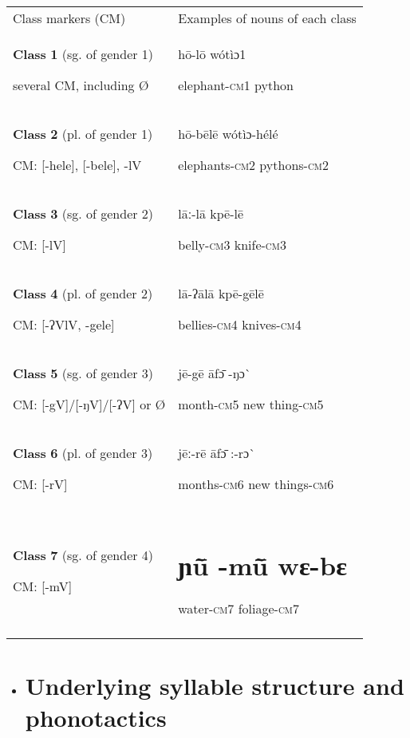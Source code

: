 \begin{tabularx}{\textwidth}{XX}
\lsptoprule

Class markers (CM) & Examples of nouns of each class\\
\textbf{Class} \textbf{1} (sg. of gender 1)

       several CM, including Ø & hō-lō                      wótìɔ1   

elephant-\textsc{cm1}            python\\
\textbf{Class} \textbf{2} (pl. of gender 1) 

       CM: [-hele], [-bele], -lV & hō-bēlē                    wótìɔ-hélé

elephants-\textsc{cm2}           pythons{}-\textsc{cm2}\\
\textbf{Class} \textbf{3} (sg. of gender 2)

        CM: [-lV] & lāː-lā                      kpē-lē

belly{}-\textsc{cm3}                knife{}-\textsc{cm3}\\
\textbf{Class} \textbf{4} (pl. of gender 2) 

        CM: [-ʔVlV, -gele] & lā-ʔālā                      kpē-gēlē

bellies-\textsc{cm4}                 knives{}-\textsc{cm4}\\
\textbf{Class} \textbf{5} (sg. of gender 3)

       CM: [-gV]/[-ŋV]/[-ʔV] or Ø & jē-gē                        āfɔ\={} {}-ŋɔ\`{} 

month-\textsc{cm5}                 new thing\-{}-\textsc{cm5}\\
\textbf{Class} \textbf{6} (pl. of gender 3) 

       CM: [-rV] & jēː-rē                       āfɔ\={} :-rɔ\`{} 

months-\textsc{cm6}              new things{}-\textsc{cm6}\\
\textbf{Class} \textbf{7} (sg. of gender 4)

       CM: [-mV] & \section{ɲũ\={} {}-mũ\={}                     wɛ-bɛ} 
water-\textsc{cm7}                  foliage{}-\textsc{cm7}\\
\lspbottomrule
\end{tabularx}

\begin{itemize}
\item \section{ Underlying syllable structure and phonotactics}\end{itemize}

